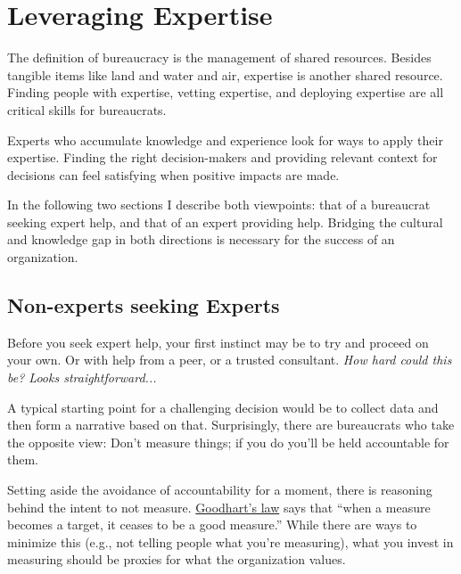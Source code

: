 \section{Leveraging Expertise\label{sec:expertise}}



The definition of \gls{bureaucracy} is the management of shared resources. Besides tangible items like land and water and air, expertise is another shared resource. Finding people with expertise, vetting expertise, and deploying expertise are all critical skills for bureaucrats. 

Experts who accumulate knowledge and experience look for ways to apply their expertise. Finding the right decision-makers and providing relevant context for decisions can feel satisfying when positive impacts are made. 


In the following two sections I describe both viewpoints: that of a bureaucrat seeking expert help, and that of an expert providing help. Bridging the cultural and knowledge gap in both directions is necessary for the success of an organization.

\subsection*{Non-experts seeking Experts}

Before you seek expert help, your first instinct may be to try and proceed on your own. Or with help from a peer, or a trusted consultant. \textit{How hard could this be? Looks straightforward...}

A typical starting point for a challenging decision would be to collect data and then form a narrative based on that. Surprisingly, there are bureaucrats who take the opposite view: Don't measure things; if you do you'll be held accountable for them. 

Setting aside the avoidance of accountability for a moment, there is reasoning behind the intent to not measure.  \href{https://en.wikipedia.org/wiki/Goodhart\%27s_law}{Goodhart's law}
says that ``when a measure becomes a target, it ceases to be a good measure.'' While there are ways to minimize this (e.g., not telling people what you're measuring), what you invest in measuring should be proxies for what the organization values.

